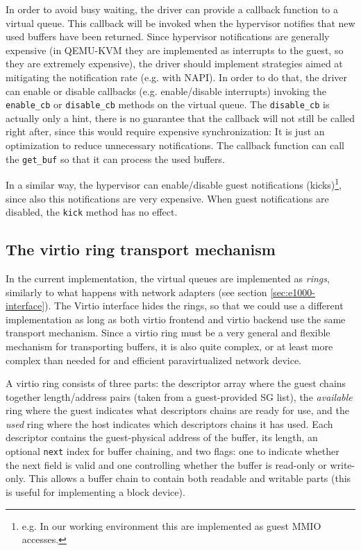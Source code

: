 In order to avoid busy waiting, the driver can provide a callback function to a virtual queue. This callback will be invoked when the
hypervisor notifies that new used buffers have been returned. Since hypervisor notifications are generally expensive (in QEMU-KVM they are 
implemented as interrupts to the guest, so they are extremely expensive), the driver should implement strategies aimed at mitigating the
notification rate (e.g. with NAPI). In order to do that, the driver can enable or disable callbacks (e.g. enable/disable interrupts) 
invoking the \texttt{enable\_cb} or \texttt{disable\_cb} methods on the virtual queue. The \texttt{disable\_cb} is actually only a hint,
there is no guarantee that the callback will not still be called right after, since this would require expensive synchronization: It is
just an optimization to reduce unnecessary notifications.
The callback function can call the \texttt{get\_buf} so that it can process the used buffers.

\vspace{0.5cm}

In a similar way, the hypervisor can enable/disable guest notifications (kicks)\footnote{e.g. In our working environment this are
implemented as guest MMIO accesses.}, since also this notifications are very expensive. When guest notifications are disabled,
the \texttt{kick} method has no effect.


\subsection{The virtio ring transport mechanism}
In the current implementation, the virtual queues are implemented as \emph{rings}, similarly to what happens with network adapters (see
section \ref{sec:e1000-interface}). The Virtio interface hides the rings, so that we could use a different implementation as
long as both virtio frontend and virtio backend use the same transport mechanism.
Since a virtio ring must be a very general and flexible mechanism for transporting buffers, it is also quite complex, or at least more
complex than needed for and efficient paravirtualized network device.

\vspace{0.5cm}

A virtio ring consists of three parts: the descriptor array where the guest chains together length/address pairs (taken from a guest-provided
SG list), the \emph{available} ring where the guest indicates what descriptors chains are ready for use, and the \emph{used} ring where the
host indicates which descriptors chains it has used. Each descriptor contains the guest-physical address of the buffer, its length, an 
optional \texttt{next} index for buffer chaining, and two flags: one to indicate whether the next field is valid and one controlling 
whether the buffer is read-only or write-only. This allows a buffer chain to contain both readable and writable parts (this is 
useful for implementing a block device).


